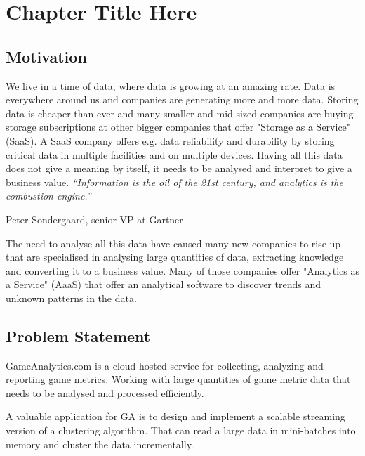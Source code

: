 
\chapter{Chapter Title Here} %
\label{Chapter1}

\section{Motivation}
We live in a time of data, where data is growing at an amazing rate. Data is everywhere around us and companies are generating more and more data.
Storing data is cheaper than ever and many smaller and mid-sized companies are buying storage subscriptions at other bigger companies that offer "Storage as a Service" (SaaS). A SaaS company offers e.g. data reliability and durability by storing critical data in multiple facilities and on multiple devices. 
Having all this data does not give a meaning by itself, it needs to be analysed and interpret to give a business value.
\null\vfill
\textit{``Information is the oil of the 21st century, and analytics is the combustion engine.''}

\begin{flushright}
Peter Sondergaard, senior VP at Gartner
\end{flushright}


The need to analyse all this data have caused many new companies to rise up that are specialised in analysing large quantities of data, extracting knowledge and converting it to a business value. Many of those companies offer "Analytics as a Service" (AaaS) that offer an analytical software to discover trends and unknown patterns in the data.

\section{Problem Statement}
GameAnalytics.com is a cloud hosted service for collecting, analyzing and reporting game metrics. Working with large quantities of game metric data that needs to be analysed and processed efficiently. 

A valuable application for GA is to design and implement a scalable streaming version of a clustering algorithm. That can read a large data in mini-batches into memory and cluster the data incrementally. 

